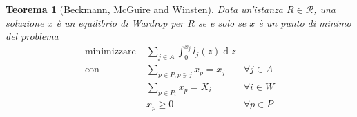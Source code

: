\documentclass[a4paper]{article}
\theoremstyle{plain}
\newtheorem{myteo}{Teorema}[section]
\theoremstyle{definition}
\theoremstyle{remark}
\DeclareMathOperator{\de}{d}
\begin{document}
\begin{myteo}[Beckmann, McGuire and Winsten]
  Data un'istanza $R\in \mathcal{R}$, una soluzione $x$ è un equilibrio di
  Wardrop per $R$ se e solo se $x$ è un punto di minimo del problema
  \begin{align*}
    \text{minimizzare} \;&  \sum _{j\in A} \int _0 ^ {x_j}
                           l_j(z)\de z \\
    \text{con} \;& \sum _{p\in P, p\ni j} x_p = x_j&\forall j\in
                                                     A\\
                         & \sum _{p\in P_i} x_p = X_i& \forall i\in W\\
                         & x_p \ge 0&\forall p\in P        
  \end{align*}
\end{myteo}
\end{document}
